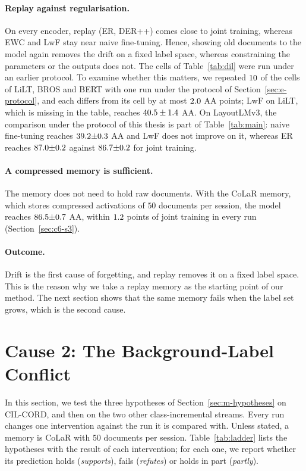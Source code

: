 \paragraph{Replay against regularisation.} On every encoder, replay (ER, DER++) comes
close to joint training, whereas EWC and LwF stay near naive fine-tuning. Hence, showing
old documents to the model again removes the drift on a fixed label space, whereas
constraining the parameters or the outputs does not. The cells of Table~\ref{tab:dil} were
run under an earlier protocol. To examine whether this matters, we repeated
$10$ of the cells of LiLT, BROS and BERT with one run under the protocol of
Section~\ref{sec:e-protocol}, and each differs from its cell by at most $2.0$
AA points; LwF on LiLT, which is missing in the table, reaches $40.5\pm1.4$ AA. On
LayoutLMv3, the comparison under the protocol of this thesis is part of
Table~\ref{tab:main}: naive fine-tuning reaches $39.2{\pm}0.3$ AA and LwF does not improve
on it, whereas ER reaches $87.0{\pm}0.2$ against $86.7{\pm}0.2$ for joint training.

\paragraph{A compressed memory is sufficient.} The memory does not need to hold raw
documents. With the CoLaR memory, which stores compressed activations of $50$ documents
per session, the model reaches $86.5{\pm}0.7$ AA, within $1.2$ points of joint
training in every run (Section~\ref{sec:c6-s3}).

\paragraph{Outcome.} Drift is the first cause of forgetting, and replay removes it on a
fixed label space. This is the reason why we take a replay memory as the starting point of
our method. The next section shows that the same memory fails when the label set grows,
which is the second cause.

\section{Cause 2: The Background-Label Conflict}
\label{sec:c6-s2}

In this section, we test the three hypotheses of Section~\ref{sec:m-hypotheses} on
CIL-CORD, and then on the two other class-incremental streams. Every run changes one
intervention against the run it is compared with. Unless stated, a memory is CoLaR with
$50$ documents per session. Table~\ref{tab:ladder} lists the hypotheses with the result of
each intervention; for each one, we report whether its prediction holds (\emph{supports}),
fails (\emph{refutes}) or holds in part (\emph{partly}).

